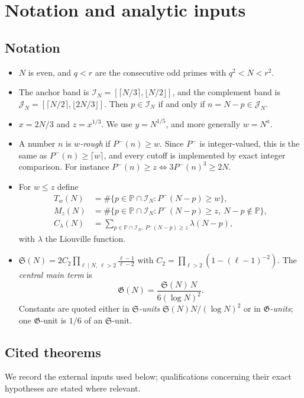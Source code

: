 \documentclass[final,11pt]{elsarticle}
\theoremstyle{definition}
\theoremstyle{remark}
\newcommand{\PP}{\mathbb{P}}
\newcommand{\Sg}{\mathfrak{S}}
\newcommand{\GG}{\mathfrak{G}}
\newcommand{\Pm}{P^{-}}
\newcommand{\band}{\mathcal{I}_N}
\newcommand{\cband}{\mathcal{J}_N}
\numberwithin{equation}{section}
\begin{document}
\section{Notation and analytic inputs}\label{sec:prelim}

\subsection{Notation}
\begin{itemize}
\item $N$ is even, and $q<r$ are the consecutive odd primes with $q^2<N<r^2$.
\item The anchor band is $\band=[\lceil N/3\rceil,\lfloor N/2\rfloor]$, and the complement band is $\cband=[\lceil N/2\rceil,\lfloor 2N/3\rfloor]$. Then $p\in\band$ if and only if $n=N-p\in\cband$.
\item $x=2N/3$ and $z=x^{1/3}$. We use $y=N^{1/5}$, and more generally $w=N^{a}$.
\item A number $n$ is \emph{$w$-rough} if $\Pm(n)\ge w$. Since $\Pm$ is integer-valued, this is the same as $\Pm(n)\ge\lceil w\rceil$, and every cutoff is implemented by exact integer comparison. For instance $\Pm(n)\ge z\Leftrightarrow 3\Pm(n)^3\ge 2N$.
\item For $w\le z$ define
\begin{align*}
T_w(N)&=\#\{p\in\PP\cap\band:\Pm(N-p)\ge w\},\\
M_z(N)&=\#\{p\in\PP\cap\band:\Pm(N-p)\ge z,\ N-p\notin\PP\},\\
C_\lambda(N)&=\sum_{p\in\PP\cap\band,\ \Pm(N-p)\ge z}\lambda(N-p),
\end{align*}
with $\lambda$ the Liouville function.
\item $\Sg(N)=2C_2\prod_{\ell\mid N,\ \ell>2}\frac{\ell-1}{\ell-2}$ with $C_2=\prod_{\ell>2}(1-(\ell-1)^{-2})$. The \emph{central main term} is
\[
\GG(N)=\frac{\Sg(N)\,N}{6(\log N)^2}.
\]
Constants are quoted either in \emph{$\Sg$-units} $\Sg(N)N/(\log N)^2$ or in \emph{$\GG$-units}; one $\GG$-unit is $1/6$ of an $\Sg$-unit.
\end{itemize}

\subsection{Cited theorems}
We record the external inputs used below; qualifications concerning their exact hypotheses are stated where relevant.
\end{document}
